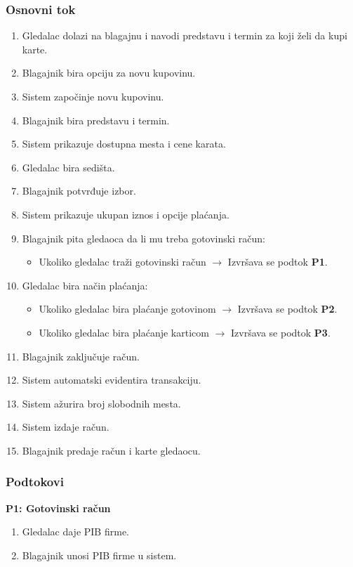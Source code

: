 \subsubsection*{Osnovni tok}
\begin{enumerate}
    \item Gledalac dolazi na blagajnu i navodi predstavu i termin za koji želi da kupi karte.
    \item Blagajnik bira opciju za novu kupovinu.
    \item Sistem započinje novu kupovinu.
    \item Blagajnik bira predstavu i termin.
    \item Sistem prikazuje dostupna mesta i cene karata.
    \item Gledalac bira sedišta.
    \item Blagajnik potvrđuje izbor.
    \item Sistem prikazuje ukupan iznos i opcije plaćanja.
    \item Blagajnik pita gledaoca da li mu treba gotovinski račun:
    \begin{itemize}
        \item Ukoliko gledalac traži gotovinski račun $\rightarrow$ Izvršava se podtok \textbf{P1}.
    \end{itemize}
    \item Gledalac bira način plaćanja:
    \begin{itemize}
        \item Ukoliko gledalac bira plaćanje gotovinom $\rightarrow$ Izvršava se podtok \textbf{P2}.
        \item Ukoliko gledalac bira plaćanje karticom $\rightarrow$ Izvršava se podtok \textbf{P3}.
    \end{itemize}
    \item Blagajnik zaključuje račun.
    \item Sistem automatski evidentira transakciju.
    \item Sistem ažurira broj slobodnih mesta.
    \item Sistem izdaje račun.
    \item Blagajnik predaje račun i karte gledaocu.
\end{enumerate}

\subsubsection*{Podtokovi}

\textbf{P1: Gotovinski račun}
\begin{enumerate}
    \item Gledalac daje PIB firme.
    \item Blagajnik unosi PIB firme u sistem.
\end{enumerate}

